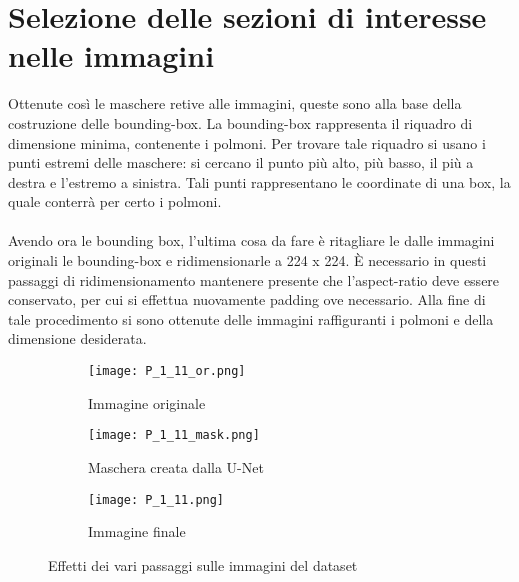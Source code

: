 \section{Selezione delle sezioni di interesse nelle immagini}
Ottenute così le maschere retive alle immagini, queste sono alla base della costruzione delle bounding-box.
La bounding-box rappresenta il riquadro di dimensione minima, contenente i polmoni.
Per trovare tale riquadro si usano i punti estremi delle maschere: si cercano il punto più alto, più basso, il più a destra e l'estremo a sinistra.
Tali punti rappresentano le coordinate di una box, la quale conterrà per certo i polmoni.
\\\\
Avendo ora le bounding box, l'ultima cosa da fare è ritagliare le dalle immagini originali le bounding-box e ridimensionarle a 224 x 224.
È necessario in questi passaggi di ridimensionamento mantenere presente che l'aspect-ratio deve essere conservato, per cui si effettua nuovamente padding ove necessario.
Alla fine di tale procedimento si sono ottenute delle immagini raffiguranti i polmoni e della dimensione desiderata.
\begin{figure}[h]
    \centering
    \begin{subfigure}{.45\textwidth}
        \centering
        \texttt{[image: P\_1\_11\_or.png]}  
        \caption{Immagine originale}
    \end{subfigure}
    \begin{subfigure}{.45\textwidth}
        \centering
        \texttt{[image: P\_1\_11\_mask.png]}  
        \caption{Maschera creata dalla U-Net}
    \end{subfigure}
    \begin{subfigure}{.45\textwidth}
        \centering
        \texttt{[image: P\_1\_11.png]}  
        \caption{Immagine finale}
    \end{subfigure}
    \caption{Effetti dei vari passaggi sulle immagini del dataset}
    \label{Transformation}
\end{figure}
